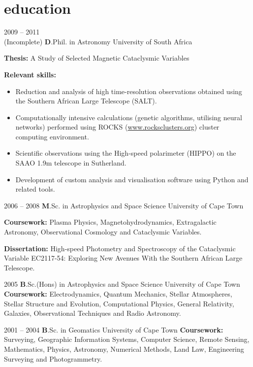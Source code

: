 \documentclass[]{friggeri-cv} %
\begin{document}
\section{education}
\begin{entrylist}
\entry
{2009 -- 2011 \\(Incomplete)}
{\textbf D.Phil. in Astronomy}
{University of South Africa}
{{\textbf{Thesis:} A Study of Selected Magnetic Cataclysmic Variables}

{\textbf{Relevant skills:}
    \begin{itemize}
        \item Reduction and analysis of high time-resolution observations obtained using the Southern African Large Telescope (SALT).
        \item Computationally intensive calculations (genetic algorithms, utilising neural networks) performed
        using ROCKS (\url{www.rocksclusters.org}) cluster computing environment.
        \item Scientific observations using the High-speed polarimeter (HIPPO) on the SAAO 1.9m telescope in
        Sutherland.
        \item Development of custom analysis and visualisation software using Python and related tools.
\end{itemize}}
}
\entry
{2006 -- 2008}
{\textbf M.Sc. in Astrophysics and Space Science}
{University of Cape Town}
{{\textbf{Coursework:} Plasma Physics, Magnetohydrodynamics, Extragalactic Astronomy, Observational
Cosmology and Cataclysmic Variables.}

{\textbf{Dissertation:} High-speed Photometry and Spectroscopy of the Cataclysmic Variable EC2117-54: Exploring New Avenues With the Southern African Large Telescope.}}
\entry
{2005}
{\textbf B.Sc.(Hons) in Astrophysics and Space Science}
{University of Cape Town}
{{\textbf{Coursework:} Electrodynamics, Quantum Mechanics, Stellar Atmospheres, Stellar Structure and Evolution, Computational Physics, General Relativity, Galaxies, Observational Techniques and Radio Astronomy.}}
\end{entrylist}
\begin{entrylist}
\entry
{2001 -- 2004}
{\textbf B.Sc. in Geomatics}
{University of Cape Town}
{{\textbf{Coursework:} Surveying, Geographic Information Systems, Computer Science, Remote Sensing,
Mathematics, Physics, Astronomy, Numerical Methods, Land Law, Engineering Surveying and Photogrammetry.}}
\end{entrylist}
\end{document}
